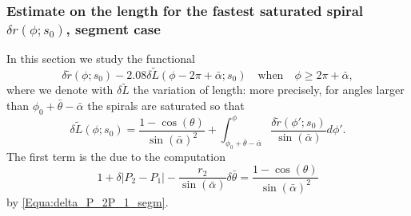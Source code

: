 \documentclass[reqno]{amsart}
\theoremstyle{definition} \newtheorem{definition}{Definition}[section]
\theoremstyle{definition} \newtheorem{remark}[definition]{Remark}
\theoremstyle{plain} \newtheorem{lemma}[definition]{Lemma}
\theoremstyle{plain} \newtheorem{proposition}[definition]{Proposition}
\theoremstyle{plain} \newtheorem{theorem}[definition]{Theorem}
\theoremstyle{plain} \newtheorem{corollary}[definition]{Corollary}
\theoremstyle{definition} \newtheorem{example}[definition]{Example}
\theoremstyle{plain} \newtheorem{claim}[clai]{Claim}
\theoremstyle{definition} \newtheorem{assumption}[definition]{Assumption}
\theoremstyle{definition} \newtheorem{observation}[definition]{Observation}
\newcommand{\1}{\mathbbm 1}
\numberwithin{equation}{section} %
\theoremstyle{plain} \newtheorem*{theorem*}{Theorem}
\theoremstyle{plain} \newtheorem{mthm}[maintheorem]{Main Theorem}
\theoremstyle{plain} \newtheorem*{mthm*}{Main Theorem}
\theoremstyle{plain} \newtheorem*{conjecture*}{Conjecture}
\theoremstyle{plain} \newtheorem{conjecture}[definition]{Conjecture}
\theoremstyle{plain} \newtheorem*{problem*}{Problem}
\begin{document}
%
%


\subsubsection{Estimate on the length for the fastest saturated spiral $\delta r(\phi;s_0)$, segment case}
\label{Sss:additional_estim_opt_segm}


In this section we study the functional
\begin{equation}
\label{Equa:Lpert_segm}
\delta \tilde r(\phi;s_0) - 2.08 \delta \tilde L(\phi - 2\pi + \bar \alpha;s_0) \quad \text{when} \quad \phi \geq 2\pi + \bar \alpha,
\end{equation}
where we denote with $\delta \tilde L$ the variation of length: more precisely, for angles larger than $\phi_0 + \bar \theta - \bar \alpha$ the spirals are saturated so that
\begin{equation*}
\delta \tilde L(\phi;s_0) = \frac{1 - \cos(\theta)}{\sin(\bar \alpha)^2} + \int_{\phi_0 + \bar \theta - \bar \alpha}^\phi \frac{\delta \tilde r(\phi';s_0)}{\sin(\bar \alpha)} d\phi'.
\end{equation*}
The first term is the due to the computation
\begin{equation*}
1 + \delta |P_2 - P_1| - \frac{r_2}{\sin(\bar \alpha)} \delta \bar \theta = \frac{1 - \cos(\theta)}{\sin(\bar \alpha)^2}
\end{equation*}
by \eqref{Equa:delta_P_2P_1_segm}.
\end{document}
